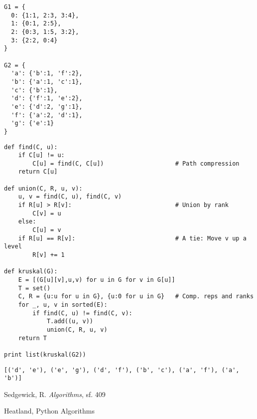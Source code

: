 \documentclass[12pt,fleqn]{article}\usepackage{../common}
\begin{document}
\begin{verbatim}
G1 = {
  0: {1:1, 2:3, 3:4},
  1: {0:1, 2:5},
  2: {0:3, 1:5, 3:2},
  3: {2:2, 0:4}
}

G2 = {
  'a': {'b':1, 'f':2},
  'b': {'a':1, 'c':1},
  'c': {'b':1},
  'd': {'f':1, 'e':2},
  'e': {'d':2, 'g':1},
  'f': {'a':2, 'd':1},
  'g': {'e':1}
}
\end{verbatim}


\begin{verbatim}
def find(C, u):
    if C[u] != u:
        C[u] = find(C, C[u])                    # Path compression
    return C[u]

def union(C, R, u, v):
    u, v = find(C, u), find(C, v)
    if R[u] > R[v]:                             # Union by rank
        C[v] = u
    else:
        C[u] = v
    if R[u] == R[v]:                            # A tie: Move v up a level
        R[v] += 1

def kruskal(G):
    E = [(G[u][v],u,v) for u in G for v in G[u]]
    T = set()
    C, R = {u:u for u in G}, {u:0 for u in G}   # Comp. reps and ranks
    for _, u, v in sorted(E):
        if find(C, u) != find(C, v):
            T.add((u, v))
            union(C, R, u, v)
    return T

print list(kruskal(G2))
\end{verbatim}

\begin{verbatim}
[('d', 'e'), ('e', 'g'), ('d', 'f'), ('b', 'c'), ('a', 'f'), ('a', 'b')]
\end{verbatim}













Sedgewick, R. {\em Algorithms}, sf. 409

Heatland, Python Algorithms
\end{document}
